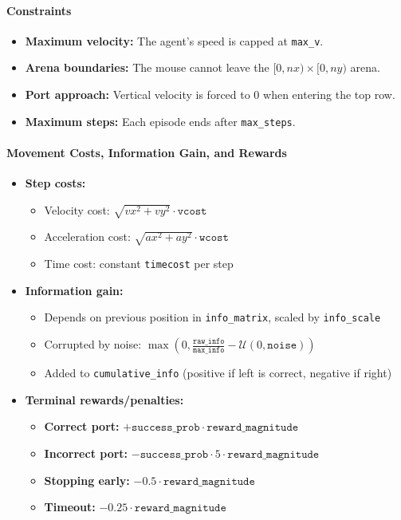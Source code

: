 \paragraph*{Constraints}
\begin{itemize}
    \item \textbf{Maximum velocity:} The agent's speed is capped at \texttt{max\_v}.
    \item \textbf{Arena boundaries:} The mouse cannot leave the $[0, nx)\times[0, ny)$ arena.
    \item \textbf{Port approach:} Vertical velocity is forced to 0 when entering the top row.
    \item \textbf{Maximum steps:} Each episode ends after \texttt{max\_steps}.
\end{itemize}

\paragraph*{Movement Costs, Information Gain, and Rewards}

\begin{itemize}
    \item \textbf{Step costs:}
    \begin{itemize}
        \item Velocity cost: $\sqrt{vx^2 + vy^2} \cdot \texttt{vcost}$
        \item Acceleration cost: $\sqrt{ax^2 + ay^2} \cdot \texttt{wcost}$
        \item Time cost: constant \texttt{timecost} per step
    \end{itemize}

    \item \textbf{Information gain:}
    \begin{itemize}
        \item Depends on previous position in \texttt{info\_matrix}, scaled by \texttt{info\_scale}
        \item Corrupted by noise: $ \max(0, \frac{\texttt{raw\_info}}{\texttt{max\_info}} - \mathcal{U}(0, \texttt{noise})) $
        \item Added to \texttt{cumulative\_info} (positive if left is correct, negative if right)
    \end{itemize}

    \item \textbf{Terminal rewards/penalties:}
    \begin{itemize}
        \item \textbf{Correct port:} $+\texttt{success\_prob} \cdot \texttt{reward\_magnitude}$
        \item \textbf{Incorrect port:} $-\texttt{success\_prob} \cdot 5 \cdot \texttt{reward\_magnitude}$
        \item \textbf{Stopping early:} $-0.5 \cdot \texttt{reward\_magnitude}$
        \item \textbf{Timeout:} $-0.25 \cdot \texttt{reward\_magnitude}$
    \end{itemize}
\end{itemize}

